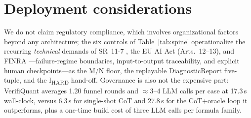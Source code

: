 \section{Deployment considerations}\label{sec:deployment}
We do not claim regulatory compliance, which involves organizational factors beyond any architecture; the six controls of Table~\ref{tab:spine} operationalize the recurring \emph{technical} demands of SR~11-7 \cite{fed2011sr117}, the EU AI Act \cite{euaiact2024} (Arts.~12--13), and FINRA \cite{finra2020ai}---failure-regime boundaries, input-to-output traceability, and explicit human checkpoints---as the M/N floor, the replayable DiagnosticReport five-tuple, and the I\textsubscript{HARD} hand-off.
Governance is also not the expensive part: VerifiQuant averages 1.20 funnel rounds and ${\approx}$3--4 LLM calls per case at 17.3\,s wall-clock, versus 6.3\,s for single-shot CoT and 27.8\,s for the CoT+oracle loop it outperforms, plus a one-time build cost of three LLM calls per formula family.

